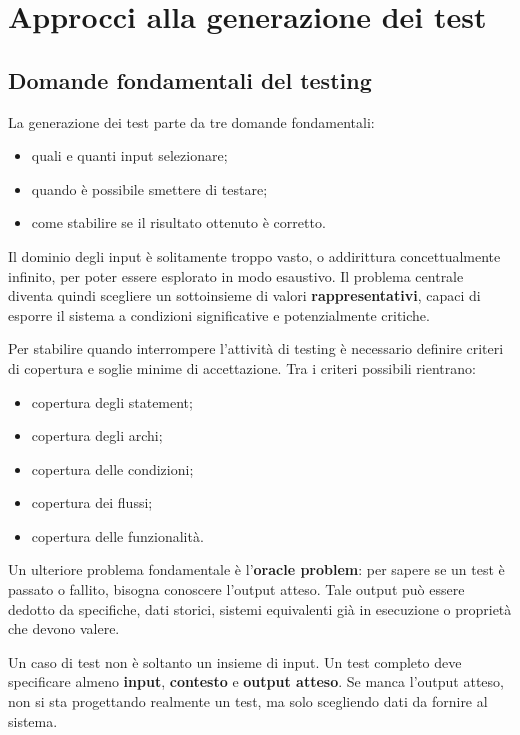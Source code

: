 \chapter{Approcci alla generazione dei test}

\section{Domande fondamentali del testing}

La generazione dei test parte da tre domande fondamentali:

\begin{itemize}
    \item quali e quanti input selezionare;
    \item quando è possibile smettere di testare;
    \item come stabilire se il risultato ottenuto è corretto.
\end{itemize}

Il dominio degli input è solitamente troppo vasto, o addirittura concettualmente infinito, per poter essere esplorato in modo esaustivo. Il problema centrale diventa quindi scegliere un sottoinsieme di valori \textbf{rappresentativi}, capaci di esporre il sistema a condizioni significative e potenzialmente critiche.

Per stabilire quando interrompere l'attività di testing è necessario definire criteri di copertura e soglie minime di accettazione. Tra i criteri possibili rientrano:

\begin{itemize}
    \item copertura degli statement;
    \item copertura degli archi;
    \item copertura delle condizioni;
    \item copertura dei flussi;
    \item copertura delle funzionalità.
\end{itemize}

Un ulteriore problema fondamentale è l'\textbf{oracle problem}: per sapere se un test è passato o fallito, bisogna conoscere l'output atteso. Tale output può essere dedotto da specifiche, dati storici, sistemi equivalenti già in esecuzione o proprietà che devono valere.

\begin{notaprof}
Un caso di test non è soltanto un insieme di input. Un test completo deve specificare almeno \textbf{input}, \textbf{contesto} e \textbf{output atteso}. Se manca l'output atteso, non si sta progettando realmente un test, ma solo scegliendo dati da fornire al sistema.
\end{notaprof}

